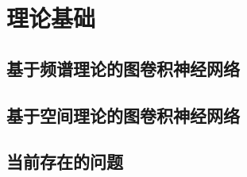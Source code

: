 \cleardoublepage

\section{理论基础}

\subsection{基于频谱理论的图卷积神经网络}

\subsection{基于空间理论的图卷积神经网络}

\subsection{当前存在的问题}